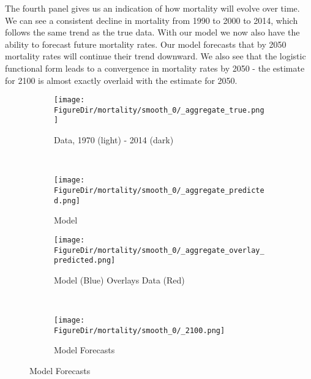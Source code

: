 \documentclass[10pt]{article}
\renewcommand{\thesection}{\arabic{section}}
\renewcommand{\thesubsection}{\thesection.\arabic{subsection}}
\renewcommand{\thesubsubsection}{\thesubsection.\arabic{subsubsection}}
\renewcommand{\subsubsection}[2][]{\oldsubsubsection[#1]{#2}\index{#1}\label{sec:\thesubsubsection}}
\numberwithin{equation}{subsection}
\newcommand*{\FigureDir}{../../graphs}
\begin{document}
\par The fourth panel gives us an indication of how mortality will evolve over time. We can see a consistent decline in mortality from 1990 to 2000 to 2014, which follows the same trend as the true data. With our model we now also have the ability to forecast future mortality rates. Our model forecasts that by 2050 mortality rates will continue their trend downward. We also see that the logistic functional form leads to a convergence in mortality rates by 2050 - the estimate for 2100 is almost exactly overlaid with the estimate for 2050.

\begin{figure}[!ht]
   \centering
   \caption{\label{fig:\thesubsubsection.4}Mortality Generalized Beta 2 Model Fit}
   \begin{subfigure}{0.5\textwidth}
      \centering
      \texttt{[image: \\FigureDir/mortality/smooth\_0/\_aggregate\_true.png]}
      \caption{Data, 1970 (light) - 2014 (dark)}
   \end{subfigure}%
   ~ %
   \begin{subfigure}{0.5\textwidth}
      \centering
      \texttt{[image: \\FigureDir/mortality/smooth\_0/\_aggregate\_predicted.png]}
      \caption{Model}
   \end{subfigure}%
   \newline
   \begin{subfigure}{0.5\textwidth}
      \centering
      \texttt{[image: \\FigureDir/mortality/smooth\_0/\_aggregate\_overlay\_predicted.png]}
      \caption{Model (Blue) Overlays Data (Red)}
   \end{subfigure}%
   ~ %
   \begin{subfigure}{0.5\textwidth}
      \centering
      \texttt{[image: \\FigureDir/mortality/smooth\_0/\_2100.png]}
      \caption{Model Forecasts}
   \end{subfigure}%
\end{figure}


\subsubsection{Immigration Rates}
\end{document}

